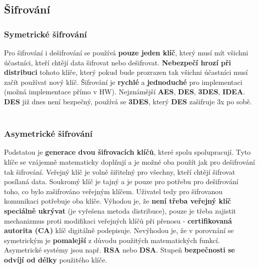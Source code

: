 \subsection{Šifrování}
\subsubsection{Symetrické šifrování}
Pro šifrování i dešifrování se používá \textbf{pouze jeden klíč}, který musí mít všichni účastníci, kteří chtějí data šifrovat nebo dešifrovat. \textbf{Nebezpečí hrozí při distribuci }tohoto klíče, který pokud bude prozrazen tak všichni účastníci musí začít používat nový klíč.  Šifrování je \textbf{rychlé} a \textbf{jednoduché} pro implementaci (možná implementace přímo v HW). Nejznámější \textbf{AES},	 \textbf{DES}, \textbf{3DES}, \textbf{IDEA}. \textbf{DES} již dnes není bezpečný, používá se \textbf{3DES}, který \textbf{DES} zašifruje 3x po sobě.
\\\\
\noindent{}

\subsubsection{Asymetrické šifrování}
Podstatou je \textbf{generace dvou šifrovacích klíčů}, které spolu spolupracují. Tyto klíče se vzájemně matematicky doplňují a je možné oba použít jak pro dešifrování tak šifrování. Veřejný klíč je volně šiřitelný pro všechny, kteří chtějí šifrovat posílaná data. Soukromý klíč je tajný a je pouze pro potřebu pro dešifrování toho, co bylo zašifrováno veřejným klíčem. Uživatel tedy pro šifrovanou komunikaci potřebuje oba klíče. Výhodou je, že\textbf{ není třeba veřejný klíč speciálně ukrývat} (je vyřešena metoda distribuce), pouze je třeba zajistit mechanizmus proti modifikaci veřejných klíčů při přenosu - \textbf{certifikovaná autorita (CA)} klíč digitálně podepisuje. Nevýhodou je, že v porovnání se symetrickým je \textbf{pomalejší} z důvodu použitých matematických funkcí. Asymetrické systémy jsou např. \textbf{RSA} nebo \textbf{DSA}. Stupeň \textbf{bezpečnosti se odvíjí od délky} použitého klíče.
\\\\
\noindent{}


